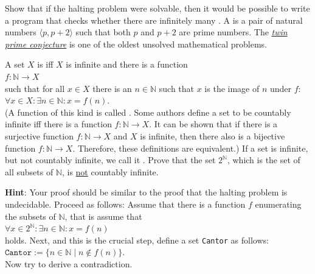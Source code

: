\exerciseEng
Show that if the halting problem were solvable, then it would be possible to write a program that checks
whether there are infinitely many .  
A  is a pair of natural numbers
$\langle p, p + 2 \rangle$ such that both $p$ and $p+2$ are prime numbers.  
The \href{http://en.wikipedia.org/wiki/Twin_prime_conjecture}{\emph{twin prime conjecture}} is one
of the oldest unsolved mathematical problems.  \eox

\exerciseEng
A set $X$ is  iff $X$ is infinite and there is a function 
\\[0.2cm]
\hspace*{1.3cm}
 $f: \mathbb{N} \rightarrow X$ 
\\[0.2cm]
such that for all $x\in X$ there is an $n \in \mathbb{N}$ such that $x$ is the image of
$n$ under $f$: 
\\[0.2cm]
\hspace*{1.3cm} $\forall x \in X: \exists n \in \mathbb{N}: x = f(n)$.
\\[0.2cm]
(A function of this kind is called . 
Some authors define a set to be countably infinite iff
there is a   function $f:\mathbb{N} \rightarrow X$.  It can be shown that if there is a
surjective function $f:\mathbb{N} \rightarrow X$ and $X$ is infinite, then there also is a bijective function
$f:\mathbb{N} \rightarrow X$.  Therefore, these definitions are equivalent.) 
If a set is infinite, but not countably infinite, we call it .
Prove that the set $2^\mathbb{N}$, which is the set of all subsets of $\mathbb{N}$, is \underline{not} countably
infinite. 

\vspace*{0.2cm}

\noindent
\textbf{Hint}:  Your proof should be similar to the proof that the halting problem is undecidable. 
Proceed as follows:
Assume that there is a function $f$ enumerating the subsets of $\mathbb{N}$, that is assume that 
\\[0.2cm]
\hspace*{1.3cm}
$\forall x \in 2^\mathbb{N}: \exists n \in \mathbb{N}: x = f(n)$
\\[0.2cm]
holds.  Next, and this is the crucial step, define a set \texttt{Cantor} as follows:
\\[0.2cm]
\hspace*{1.3cm} $\mathtt{Cantor} := \bigl\{ n \in \mathbb{N} \mid n \notin f(n) \bigr\}$.
\\[0.2cm]
Now try to derive a contradiction.  \eox

